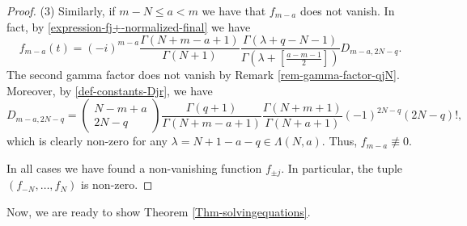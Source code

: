 \documentclass[12pt, pdflatex, a4paper]{article}
\theoremstyle{plain}
\theoremstyle{definition}
\begin{document}
\begin{proof}
(3) Similarly, if $m-N \leq a < m$ we have that $f_{m-a}$ does not vanish. In fact, by \eqref{expression-fj+-normalized-final} we have
\begin{equation*}
f_{m-a}(t) = (-i)^{m-a}\frac{\Gamma(N+m-a+1)}{\Gamma(N+1)}\frac{\Gamma\left(\lambda+q-N-1\right)}{\Gamma\left(\lambda+\left[\frac{a-m-1}{2}\right]\right)}D_{m-a, 2N-q}.
\end{equation*}
The second gamma factor does not vanish by Remark \ref{rem-gamma-factor-qjN}. Moreover, by \eqref{def-constants-Djr}, we have
\begin{equation*}
D_{m-a, 2N-q} = \begin{pmatrix}
N-m+a\\
2N-q
\end{pmatrix}
\frac{\Gamma(q+1)}{\Gamma(N+m-a+1)}\frac{\Gamma(N+m+1)}{\Gamma(N+a+1)}(-1)^{2N-q}(2N-q)!,
\end{equation*}
which is clearly non-zero for any $\lambda = N+1-a-q \in \Lambda(N,a)$. Thus, $f_{m-a} \not\equiv 0$.

In all cases we have found a non-vanishing function $f_{\pm j}$. In particular, the tuple $(f_{-N}, \ldots, f_N)$ is non-zero.
\end{proof}


Now, we are ready to show Theorem \ref{Thm-solvingequations}.
\end{document}
